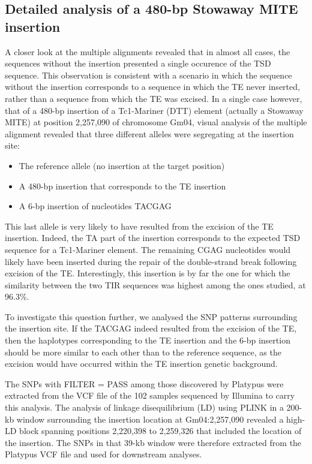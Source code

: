 \documentclass[12pt]{article}
\begin{document}
\subsection{Detailed analysis of a 480-bp Stowaway MITE insertion}

A closer look at the multiple alignments revealed that in almost all cases, the sequences without the insertion presented a single occurence of the TSD sequence.
This observation is consistent with a scenario in which the sequence without the insertion corresponds to a sequence in which the TE never inserted, rather than a sequence from which the TE was excised.
In a single case however, that of a 480-bp insertion of a Tc1-Mariner (DTT) element (actually a Stowaway MITE) at position 2,257,090 of chromosome Gm04, visual analysis of the multiple alignment revealed that three different alleles were segregating at the insertion site:

\begin{itemize}
	\item The reference allele (no insertion at the target position)
	\item A 480-bp insertion that corresponds to the TE insertion
	\item A 6-bp insertion of nucleotides TACGAG 
\end{itemize}

This last allele is very likely to have resulted from the excision of the TE insertion.
Indeed, the TA part of the insertion corresponds to the expected TSD sequence for a Tc1-Mariner element.
The remaining CGAG nucleotides would likely have been inserted during the repair of the double-strand break following excision of the TE.
Interestingly, this insertion is by far the one for which the similarity between the two TIR sequences was highest among the ones studied, at 96.3\%.

To investigate this question further, we analysed the SNP patterns surrounding the insertion site.
If the TACGAG indeed resulted from the excision of the TE, then the haplotypes corresponding to the TE insertion and the 6-bp insertion should be more similar to each other than to the reference sequence, as the excision would have occurred within the TE insertion genetic background.

The SNPs with FILTER = PASS among those discovered by Platypus \citep{platypus} were extracted from the VCF file of the 102 samples sequenced by Illumina to carry this analysis.
The analysis of linkage disequilibrium (LD) using PLINK \citep{plink} in a 200-kb window surrounding the insertion location at Gm04:2,257,090 revealed a high-LD block spanning positions 2,220,398 to 2,259,326 that included the location of the insertion.
The SNPs in that 39-kb window were therefore extracted from the Platypus VCF file and used for downstream analyses.
\end{document}
